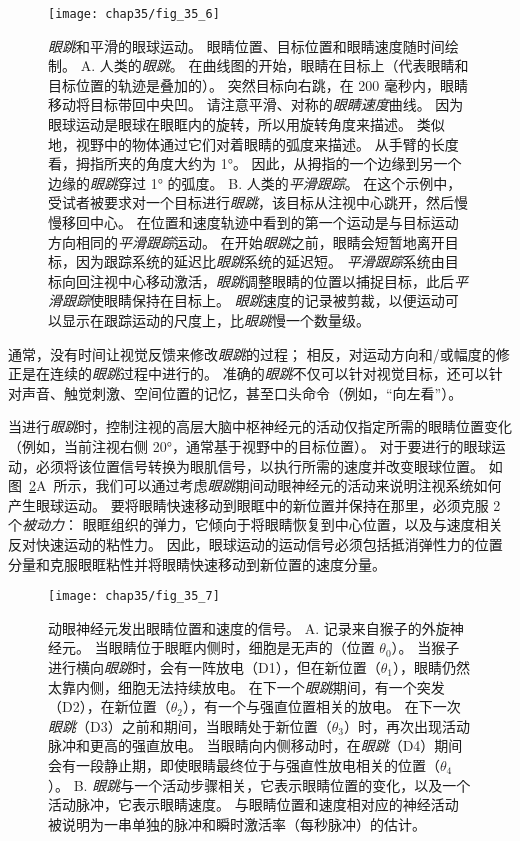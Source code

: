 \begin{figure}[htbp]
	\centering
	\texttt{[image: chap35/fig\_35\_6]}
	\caption{\textit{眼跳}和平滑的眼球运动。
		眼睛位置、目标位置和眼睛速度随时间绘制。
		A. 人类的\textit{眼跳}。
		在曲线图的开始，眼睛在目标上（代表眼睛和目标位置的轨迹是叠加的）。
		突然目标向右跳，在 200 毫秒内，眼睛移动将目标带回中央凹。
		请注意平滑、对称的\textit{眼睛速度}曲线。
		因为眼球运动是眼球在眼眶内的旋转，所以用旋转角度来描述。
		类似地，视野中的物体通过它们对着眼睛的弧度来描述。
		从手臂的长度看，拇指所夹的角度大约为 1°。
		因此，从拇指的一个边缘到另一个边缘的\textit{眼跳}穿过 1° 的弧度。
		B. 人类的\textit{平滑跟踪}。
		在这个示例中，受试者被要求对一个目标进行\textit{眼跳}，该目标从注视中心跳开，然后慢慢移回中心。
		在位置和速度轨迹中看到的第一个运动是与目标运动方向相同的\textit{平滑跟踪}运动。
		在开始\textit{眼跳}之前，眼睛会短暂地离开目标，因为跟踪系统的延迟比\textit{眼跳}系统的延迟短。
		\textit{平滑跟踪}系统由目标向回注视中心移动激活，\textit{眼跳}调整眼睛的位置以捕捉目标，此后\textit{平滑跟踪}使眼睛保持在目标上。
		\textit{眼跳}速度的记录被剪裁，以便运动可以显示在跟踪运动的尺度上，比\textit{眼跳}慢一个数量级。}
	\label{fig:35_6}
\end{figure}


通常，没有时间让视觉反馈来修改\textit{眼跳}的过程；
相反，对运动方向和/或幅度的修正是在连续的\textit{眼跳}过程中进行的。
准确的\textit{眼跳}不仅可以针对视觉目标，还可以针对声音、触觉刺激、空间位置的记忆，甚至口头命令（例如，“向左看”）。


当进行\textit{眼跳}时，控制注视的高层大脑中枢神经元的活动仅指定所需的眼睛位置变化（例如，当前注视右侧 20°，通常基于视野中的目标位置）。
对于要进行的眼球运动，必须将该位置信号转换为眼肌信号，以执行所需的速度并改变眼球位置。
如图~\ref{fig:35_7}A~所示，我们可以通过考虑\textit{眼跳}期间动眼神经元的活动来说明注视系统如何产生眼球运动。
要将眼睛快速移动到眼眶中的新位置并保持在那里，必须克服 2 个\textit{被动力}：
眼眶组织的弹力，它倾向于将眼睛恢复到中心位置，以及与速度相关反对快速运动的粘性力。
因此，眼球运动的运动信号必须包括抵消弹性力的位置分量和克服眼眶粘性并将眼睛快速移动到新位置的速度分量。


\begin{figure}[htbp]
	\centering
	\texttt{[image: chap35/fig\_35\_7]}
	\caption{动眼神经元发出眼睛位置和速度的信号。
		A. 记录来自猴子的外旋神经元。
		当眼睛位于眼眶内侧时，细胞是无声的（位置 $ \theta_0 $）。
		当猴子进行横向\textit{眼跳}时，会有一阵放电（D1），但在新位置（$ \theta_1 $），眼睛仍然太靠内侧，细胞无法持续放电。
		在下一个\textit{眼跳}期间，有一个突发（D2），在新位置（$ \theta_2 $），有一个与强直位置相关的放电。
		在下一次\textit{眼跳}（D3）之前和期间，当眼睛处于新位置（$ \theta_3 $）时，再次出现活动脉冲和更高的强直放电。
		当眼睛向内侧移动时，在\textit{眼跳}（D4）期间会有一段静止期，即使眼睛最终位于与强直性放电相关的位置（$ \theta_4 $）\cite{fuchs1970firing}。
		B. \textit{眼跳}与一个活动步骤相关，它表示眼睛位置的变化，以及一个活动脉冲，它表示眼睛速度。
		与眼睛位置和速度相对应的神经活动被说明为一串单独的脉冲和瞬时激活率（每秒脉冲）的估计。}
	\label{fig:35_7}
\end{figure}


